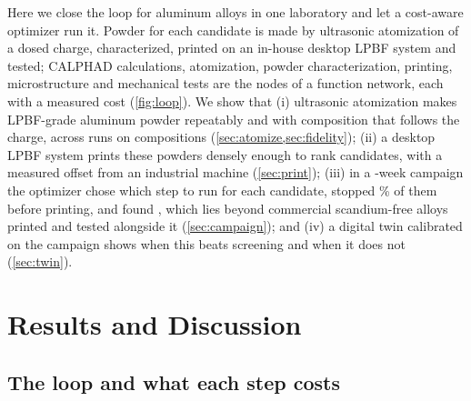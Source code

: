 \documentclass[11pt]{article}
\begin{document}
Here we close the loop for aluminum alloys in one laboratory and let a
cost-aware optimizer run it. Powder for each candidate is made by ultrasonic
atomization of a dosed charge, characterized, printed on an in-house desktop
LPBF system and tested; CALPHAD calculations, atomization, powder
characterization, printing, microstructure and mechanical tests are the nodes
of a function network, each with a measured cost (\cref{fig:loop}). We show
that (i) ultrasonic atomization makes LPBF-grade aluminum powder repeatably and
with composition that follows the charge, across  runs on 
compositions (\cref{sec:atomize,sec:fidelity}); (ii) a desktop LPBF system
prints these powders densely enough to rank candidates, with a measured offset
from an industrial machine (\cref{sec:print}); (iii) in a -week campaign
the optimizer chose which step to run for each candidate, stopped \% of
them before printing, and found , which lies beyond commercial
scandium-free alloys printed and tested alongside it (\cref{sec:campaign}); and (iv) a
digital twin calibrated on the campaign shows when this beats screening and
when it does not (\cref{sec:twin}).

\section{Results and Discussion}
\label{sec:results}

\subsection{The loop and what each step costs}
\label{sec:loop}
\end{document}
